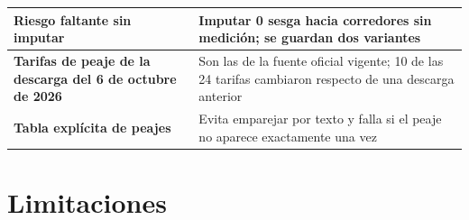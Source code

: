 \documentclass[12pt,a4paper]{article}
\begin{document}
\begin{table}[H]
\begin{tabular}{|>{\raggedright\arraybackslash}p{4.4cm}|>{\raggedright\arraybackslash}p{9cm}|}
\hline
\textbf{Riesgo faltante sin imputar} & Imputar 0 sesga hacia corredores sin medición; se guardan dos variantes \\
\hline
\textbf{Tarifas de peaje de la descarga del 6 de octubre de 2026} & Son las de la fuente oficial vigente; 10 de las 24 tarifas cambiaron respecto de una descarga anterior \\
\hline
\textbf{Tabla explícita de peajes} & Evita emparejar por texto y falla si el peaje no aparece exactamente una vez \\
\hline
\end{tabular}
\end{table}

\section{Limitaciones}
\end{document}
